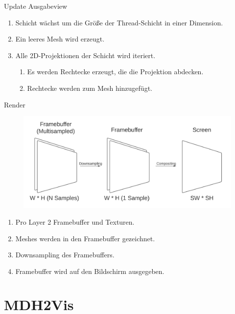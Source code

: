 \documentclass{presentation}
\begin{document}
\begin{frame}[fragile]{Update Ausgabeview}
    \begin{enumerate}
        \item Schicht wächst um die Größe der Thread-Schicht in einer Dimension.
        \item Ein leeres Mesh wird erzeugt.
        \item Alle 2D-Projektionen der Schicht wird iteriert.
        \begin{enumerate}
            \item Es werden Rechtecke erzeugt, die die Projektion abdecken.
            \item Rechtecke werden zum Mesh hinzugefügt.
        \end{enumerate}
    \end{enumerate}
\end{frame}

\begin{frame}{Render}
    \begin{figure}
        \includegraphics[scale=0.4]{render_pipeline.jpg}
    \end{figure}

    \begin{enumerate}
        \item Pro Layer 2 Framebuffer und Texturen.
        \item Meshes werden in den Framebuffer gezeichnet.
        \item Downsampling des Framebuffers.
        \item Framebuffer wird auf den Bildschirm ausgegeben.
    \end{enumerate}
\end{frame}

\section{MDH2Vis}
\end{document}
